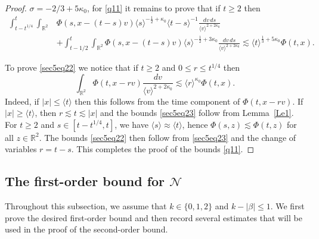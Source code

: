 \documentclass[reqno,11pt]{amsart}
\numberwithin{equation}{section}
\begin{document}
\begin{proof}
$\sigma=-2/3+5\kappa_0$, for \eqref{q11} it remains to prove that if $t\geq 2$ then
\begin{equation}\label{sec5eq22}
\begin{split}
\int_{t-t^{1/4}}^t\int_{\mathbb R^2}&\Phi(s,x-(t-s)v)\langle s\rangle^{-\frac12+\kappa_0}
\langle t-s\rangle^{-1}\frac{dv\,ds}{\langle v\rangle^{2+2\kappa_0}}\\
&+\int_{t-1/2}^t\int_{\mathbb R^2}\Phi(s,x-(t-s)v)\langle s\rangle^{-\frac12+3\kappa_0}
\frac{dv\,ds}{\langle v\rangle^{2+2\kappa_0}}\lesssim \langle t\rangle^{\frac13+5\kappa_0}\Phi(t,x).
\end{split}
\end{equation}

To prove \eqref{sec5eq22} we notice that if $t\geq 2$ and $0\leq r\leq t^{1/4}$ then
\begin{equation}\label{sec5eq23}
	\int_{\mathbb R^2}
	\Phi(t,x-rv)\frac{dv}{\langle v\rangle^{2+2\kappa_0}}
	\lesssim
	\langle r\rangle^{\kappa_0}\Phi(t,x).
\end{equation}
Indeed, if $|x|\leq\langle t\rangle$ then this follows from the time component
of $\Phi(t,x-rv)$. If $|x|\geq\langle t\rangle$, then
$r\lesssim t\lesssim|x|$ and the bounds \eqref{sec5eq23} follow from Lemma~\ref{Le1}.
For $t\geq2$ and $s\in[t-t^{1/4},t]$, we have
$\langle s\rangle\approx\langle t\rangle$, hence $\Phi(s,z)\lesssim\Phi(t,z)$
for all $z\in\mathbb R^2$.
The bounds \eqref{sec5eq22} then follow from \eqref{sec5eq23} and the change of variables $r=t-s$. This completes the proof of the bounds \eqref{q11}.
\end{proof}

\subsection{The first-order bound for $\mathcal N$}\label{firstorderbound}

Throughout this subsection, we assume that $k\in\{0,1,2\}$ and $k-|\beta|\leq1$. We first
prove the desired first-order bound and then record several estimates that
will be used in the proof of the second-order bound.
\end{document}
